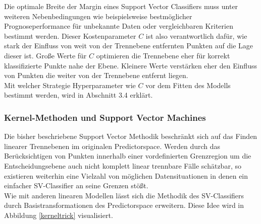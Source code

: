 Die optimale Breite der Margin eines Support Vector Classifiers muss unter weiteren Nebenbedingungen wie beispielsweise bestmöglicher Prognoseperformance für unbekannte Daten oder vergleichbaren Kriterien bestimmt werden. Dieser Kostenparameter $C$ ist also verantwortlich dafür, wie stark der Einfluss von weit von der Trennebene entfernten Punkten auf die Lage dieser ist. Große Werte für $C$ optimieren die Trennebene eher für korrekt klassifizierte Punkte nahe der Ebene. Kleinere Werte verstärken eher den Einfluss von Punkten die weiter von der Trennebene entfernt liegen. \cite{svclassifier} \\
Mit welcher Strategie Hyperparameter wie $C$ vor dem Fitten des Modells bestimmt werden, wird in Abschnitt 3.4 erklärt.  

\subsubsection{Kernel-Methoden und Support Vector Machines}

Die bisher beschriebene Support Vector Methodik beschränkt sich auf das Finden linearer Trennebenen im originalen Predictorspace. Werden durch das Berücksichtigen von Punkten innerhalb einer vordefinierten Grenzregion um die Entscheidungsebene auch nicht komplett linear trennbare Fälle schätzbar, so existieren weiterhin eine Vielzahl von möglichen Datensituationen in denen ein einfacher SV-Classifier an seine Grenzen stößt. \\
Wie mit anderen linearen Modellen lässt sich die Methodik des SV-Classifiers durch Basistransformationen des Predictorspace erweitern. Diese Idee wird in Abbildung \ref{kerneltrick} visualisiert. 

